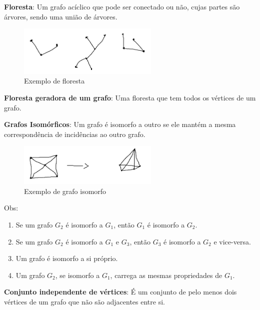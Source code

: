 \medskip

\textbf{Floresta}:  
Um grafo acíclico que pode ser conectado ou não, cujas partes são árvores, sendo uma união de árvores.

\begin{figure}[H]
    \centering
    \includegraphics[width=0.6\textwidth]{figuras/Floresta.png}
    \caption{Exemplo de floresta}
\end{figure}

\textbf{Floresta geradora de um grafo}:  
Uma floresta que tem todos os vértices de um grafo.

\medskip

\textbf{Grafos Isomórficos}:  
Um grafo é isomorfo a outro se ele mantém a mesma correspondência de incidências ao outro grafo.  

\begin{figure}[H]
    \centering
    \includegraphics[width=0.6\textwidth]{figuras/Grafoisomorfico.png}
    \caption{Exemplo de grafo isomorfo}
\end{figure}

Obs:
\begin{enumerate}
    \item Se um grafo $G_2$ é isomorfo a $G_1$, então $G_1$ é isomorfo a $G_2$.
    \item Se um grafo $G_2$ é isomorfo a $G_1$ e $G_3$, então $G_3$ é isomorfo a $G_2$ e vice-versa.
    \item Um grafo é isomorfo a si próprio.
    \item Um grafo $G_2$, se isomorfo a $G_1$, carrega as mesmas propriedades de $G_1$.
\end{enumerate}

\medskip

\textbf{Conjunto independente de vértices}:  
É um conjunto de pelo menos dois vértices de um grafo que não são adjacentes entre si.

